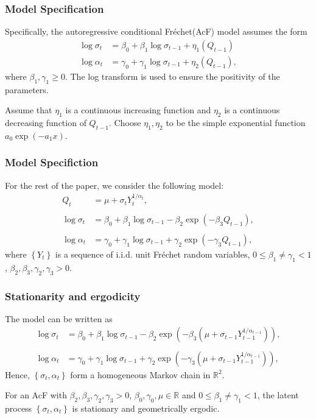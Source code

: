 \documentclass{beamer}
\newcommand{\suit}[1]{\left(#1\right)}
\newcommand{\set}[1]{\left\{#1\right\}}
\begin{document}
\begin{frame}
    \frametitle{Model Specification}
    Specifically, the autoregressive conditional Fr\'echet(AcF) model assumes the form  
    $$
\begin{aligned}
 \log \sigma_t & = \beta_0 +\beta_1 \log \sigma_{t-1}+\eta_1(Q_{t-1}) \\
    \log \alpha_t &=\gamma_0+\gamma_1 \log \sigma_{t-1}+\eta_2(Q_{t-1}) ,
\end{aligned}
    $$
    where $\beta_1,\gamma_1\ge 0$. The log
    transform is used to ensure the positivity of the parameters.

    \bigskip

    Assume that $\eta_1$ is a continuous increasing function and $\eta_2$ is a continuous decreasing function of $Q_{t-1}$. Choose $\eta_1,\eta_2$ to be the simple exponential function $a_0\exp\suit{-a_1 x}$.
\end{frame}

\begin{frame}
    \frametitle{Model Specifiction}

    For the rest of the paper, we consider the following model:
  \begin{equation}\tag{*}
\begin{aligned}
    Q_t& = \mu +\sigma_t Y_t^{1/\alpha_t}, \\
    & \\
 \log \sigma_t & = \beta_0 +\beta_1 \log \sigma_{t-1}-\beta_2\exp(-\beta_3 Q_{t-1}), \\
 & \\
    \log \alpha_t &=\gamma_0+\gamma_1 \log \sigma_{t-1}+\gamma_2\exp(-\gamma_3 Q_{t-1}) ,
\end{aligned}
\end{equation}
where $\set{Y_t}$ is a sequence of i.i.d. unit Fr\'echet random variables, $0\le \beta_1 \ne \gamma_1<1$, $\beta_2, \beta_3,\gamma_2,\gamma_3>0$.
\end{frame}


\begin{frame}
    \frametitle{Stationarity and ergodicity}
The model can be written as 
$$
\begin{aligned}
 \log \sigma_t & = \beta_0 +\beta_1 \log \sigma_{t-1}-\beta_2\exp(-\beta_3 (\mu+\sigma_{t-1}Y_{t-1}^{1/\alpha_{t-1}})), \\
 & \\
    \log \alpha_t &=\gamma_0+\gamma_1 \log \sigma_{t-1}+\gamma_2\exp(-\gamma_3  (\mu+\sigma_{t-1}Y_{t-1}^{1/\alpha_{t-1}})) ,
\end{aligned}
    $$
    Hence, $\set{\sigma_t,\alpha_t}$ form a homogeneous Markov chain in $\mathbb{R}^2$.
    
\begin{theorem}[1]
    For an AcF with $\beta_2,\beta_3,\gamma_2,\gamma_3>0$, $\beta_0,\gamma_0,\mu\in \mathbb{R}$ and $0\le \beta_1\ne \gamma_1<1$, the latent process $\set{\sigma_t,\alpha_t}$ is stationary and geometrically ergodic.
\end{theorem}
\end{frame}
\end{document}
